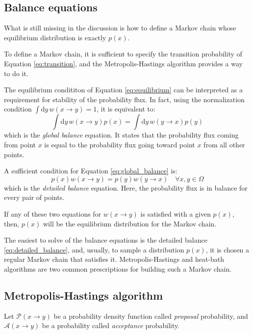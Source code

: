 \subsection*{Balance equations}
What is still missing in the discussion is how to define a Markov chain whose equilibrium distribution is exactly $p(x)$.

To define a Markov chain, it is sufficient to specify the transition probability of Equation \eqref{eq:transition},
and the Metropolis-Hastings algorithm provides a way to do it.

The equilibrium condititon of Equation \eqref{eq:equilibrium}
can be interpreted as a requirement for stability of the probability flux.
In fact, using the normalization condition $\int\mathrm dy\,w(x \to y) = 1$,
it is equivalent to:
\begin{equation}\label{eq:global_balance}
	\int\mathrm dy\,w(x \to y)p(x) = \int\mathrm dy\,w(y \to x)p(y)
\end{equation}
which is the \emph{global balance} equation.
It states that the probability flux coming from point $x$
is equal to the probability flux going toward point $x$ from all other points.

A sufficient condition for Equation \eqref{eq:global_balance} is:
\begin{equation}\label{eq:detailed_balance}
	p(x)w(x \to y) = p(y)w(y \to x) \quad \forall x,y\in\Omega
\end{equation}
which is the \emph{detailed balance} equation.
Here, the probability flux is in balance for every pair of points.

If any of these two equations for $w(x \to y)$ is satisfied with a given $p(x)$,
then, $p(x)$ will be the equilibrium distribution for the Markov chain.

The easiest to solve of the balance equations is the detailed balance \eqref{eq:detailed_balance},
and, usually, to sample a distribution $p(x)$, it is chosen a regular Markov chain that satisfies it.
Metropolis-Hastings and heat-bath algorithms are two common prescriptions for building such a Markov chain.

\subsection*{Metropolis-Hastings algorithm}
Let $\mathcal P(x\to y)$ be a probability density function called \emph{proposal} probability,
and $\mathcal A(x\to y)$ be a probability called \emph{acceptance} probability.

